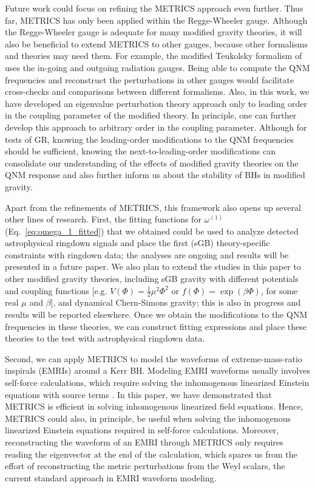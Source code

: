 \documentclass[aps,prx,amsmath,floats,floatfix,twocolumn,
  superscriptaddress,nofootinbib,showpacs]{revtex4-1}
\begin{document}
Future work could focus on refining the METRICS approach even further. 
Thus far, METRICS has only been applied within the Regge-Wheeler gauge. 
Although the Regge-Wheeler gauge is adequate for many modified gravity theories, it will also be beneficial to extend METRICS to other gauges, because other formalisms and theories may need them. 
For example, the modified Teukolsky formalism of~\cite{Li:2022pcy, Asad_Aaron_2022, Cano:2023tmv, Cano:2023jbk} uses the in-going and outgoing radiation gauges. 
Being able to compute the QNM frequencies and reconstruct the perturbations in other gauges would facilitate cross-checks and comparisons between different formalisms. 
Also, in this work, we have developed an eigenvalue perturbation theory approach only to leading order in the coupling parameter of the modified theory. 
In principle, one can further develop this approach to arbitrary order in the coupling parameter. 
Although for tests of GR, knowing the leading-order modifications to the QNM frequencies should be sufficient, knowing the next-to-leading-order modifications can consolidate our understanding of the effects of modified gravity theories on the QNM response and also further inform us about the stability of BHs in modified gravity.  

Apart from the refinements of METRICS, this framework also opens up several other lines of research. 
First, the fitting functions for $\omega^{(1)}$ (Eq.~\eqref{eq:omega_1_fitted}) that we obtained could be used to analyze detected astrophysical ringdown signals and place the first (sGB) theory-specific constraints with ringdown data; the analyses are ongoing and results will be presented in a future paper. 
We also plan to extend the studies in this paper to other modified gravity theories, including sGB gravity with different potentials and coupling functions [e.g. $V(\Phi) = \frac{1}{2} \mu^2 \Phi^2$ or $f(\Phi) = \exp(\beta \Phi)$, for some real $\mu$ and $\beta$], and dynamical Chern-Simons gravity; this is also in progress and results will be reported elsewhere. 
Once we obtain the modifications to the QNM frequencies in these theories, we can construct fitting expressions and place these theories to the test with astrophysical ringdown data. 

Second, we can apply METRICS to model the waveforms of extreme-mass-ratio inspirals (EMRIs) around a Kerr BH.
Modeling EMRI waveforms usually involves self-force calculations, which require solving the inhomogenous linearized Einstein equations with source terms \cite{Pound:2021qin}. 
In this paper, we have demonstrated that METRICS is efficient in solving inhomogenous linearized field equations. 
Hence, METRICS could also, in principle, be useful when solving the inhomogenous linearized Einstein equations required in self-force calculations. 
Moreover, reconstructing the waveform of an EMRI through METRICS only requires reading the eigenvector at the end of the calculation, which spares us from the effort of reconstructing the metric perturbations from the Weyl scalars, the current standard approach in EMRI waveform modeling. 
\end{document}
